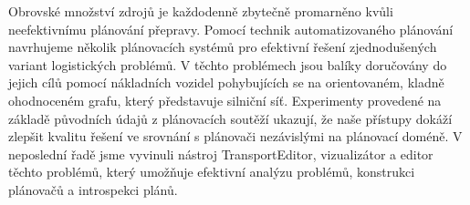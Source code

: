 \documentclass[12pt,a4paper]{article}
\begin{document}
\maketitle

Obrovské množství zdrojů je každodenně zbytečně promarněno kvůli neefektivnímu plánování přepravy.
Pomocí technik automatizovaného plánování navrhujeme několik plánovacích systémů pro efektivní řešení zjednodušených variant logistických problémů.
V těchto problémech jsou balíky doručovány do jejich cílů
pomocí nákladních vozidel pohybujících se na orientovaném, kladně ohodnoceném grafu, který představuje silniční síť.
Experimenty provedené na základě původních údajů z plánovacích soutěží ukazují, že naše přístupy dokáží zlepšit kvalitu řešení ve srovnání s plánovači nezávislými na plánovací doméně.
V neposlední řadě jsme vyvinuli nástroj TransportEditor, vizualizátor a editor těchto problémů, který umožňuje efektivní analýzu problémů, konstrukci plánovačů a introspekci plánů.
\end{document}
